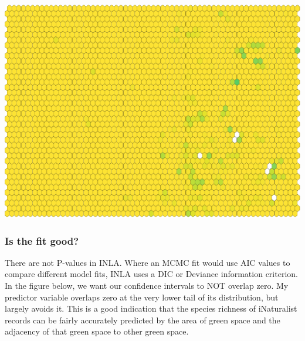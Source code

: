 \documentclass[
]{article}
\newenvironment{Shaded}{\begin{snugshade}}{\end{snugshade}}
\newcommand{\DataTypeTok}[1]{\textcolor[rgb]{0.13,0.29,0.53}{#1}}
\newcommand{\DecValTok}[1]{\textcolor[rgb]{0.00,0.00,0.81}{#1}}
\newcommand{\FloatTok}[1]{\textcolor[rgb]{0.00,0.00,0.81}{#1}}
\newcommand{\KeywordTok}[1]{\textcolor[rgb]{0.13,0.29,0.53}{\textbf{#1}}}
\newcommand{\NormalTok}[1]{#1}
\newcommand{\OperatorTok}[1]{\textcolor[rgb]{0.81,0.36,0.00}{\textbf{#1}}}
\newcommand{\OtherTok}[1]{\textcolor[rgb]{0.56,0.35,0.01}{#1}}
\newcommand{\StringTok}[1]{\textcolor[rgb]{0.31,0.60,0.02}{#1}}
\begin{document}
\begin{Shaded}
\end{Shaded}

\includegraphics{Earth_Lab_application_files/figure-latex/unnamed-chunk-18-1.pdf}

\hypertarget{is-the-fit-good}{%
\subsubsection{Is the fit good?}\label{is-the-fit-good}}

There are not P-values in INLA. Where an MCMC fit would use AIC values
to compare different model fits, INLA uses a DIC or Deviance information
criterion. In the figure below, we want our confidence intervals to NOT
overlap zero. My predictor variable overlaps zero at the very lower tail
of its distribution, but largely avoids it. This is a good indication
that the species richness of iNaturalist records can be fairly
accurately predicted by the area of green space and the adjacency of
that green space to other green space.
\end{document}
